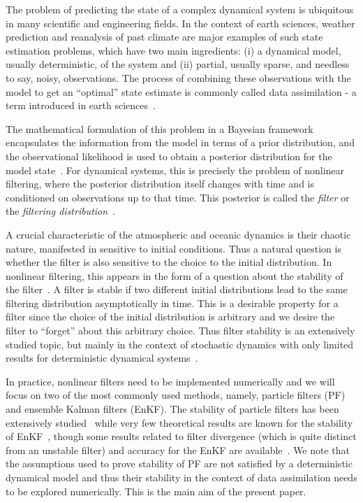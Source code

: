 

The problem of predicting the state of a complex dynamical system is
ubiquitous in many scientific and engineering fields. In the context
of earth sciences, weather prediction and reanalysis of past climate
are major examples of such state estimation problems, which have two
main ingredients: (i) a dynamical model, usually deterministic, of the
system and (ii) partial, usually sparse, and needless to say, noisy,
observations. The process of combining these observations with the
model to get an ``optimal'' state estimate is commonly called data
assimilation - a term introduced in earth sciences~\cite{Carrassi-etal2008, fletcher2017data, Kalnay03}.

The mathematical formulation of this problem in a Bayesian framework
encapsulates the information from the model in terms of a prior
distribution, and the observational likelihood is used to obtain a
posterior distribution for the model state~\cite{ApteH07, law2015data}. For dynamical systems,
this is precisely the problem of nonlinear filtering, where the
posterior distribution itself changes with time and is conditioned on
observations up to that time. This posterior is called the {\it
filter} or the {\it filtering distribution}~\cite{sarkka2013bayesian, vanleeuwen2015book, asch2016data}.

A crucial characteristic of the atmospheric and oceanic dynamics is
their chaotic nature, manifested in sensitive to initial conditions. Thus a natural question is
whether the filter is also sensitive to the choice to the initial
distribution. In nonlinear filtering, this appears in the form of a
question about the stability of the filter~\cite{chigansky2009intrinsic, chigansky2006stability, crisan2011handbook}. A filter is stable if two
different initial distributions lead to the same filtering
distribution asymptotically in time. This is a desirable property for
a filter since the choice of the initial distribution is arbitrary and
we desire the filter to ``forget'' about this arbitrary choice. Thus
filter stability is an extensively studied topic, but mainly in the context of stochastic dynamics with only limited results for deterministic dynamical systems~{\color{mypink}\cite{reddy2021stability, oljavca2021exponential, reddy2019asymptotic, Cerou2000LongTB}}.

In practice, nonlinear filters need to be implemented numerically and we
will focus on two of the most commonly used methods, namely, particle
filters (PF) and ensemble Kalman filters (EnKF). The stability of
particle filters has been extensively studied~\cite{Chopin2020, whiteley2013stability} while very few theoretical results are known for the stability of EnKF~\cite{del2018stability}, though some results related to filter divergence (which is quite distinct from an unstable filter) and accuracy for the EnKF are available~\cite{KLS14, law2016filter, gottwald2013mechanism}. We
note that the assumptions used to prove stability of PF are
not satisfied by a deterministic dynamical model and thus their
stability in the context of data assimilation needs to be explored
numerically. This is the main aim of the present paper.

